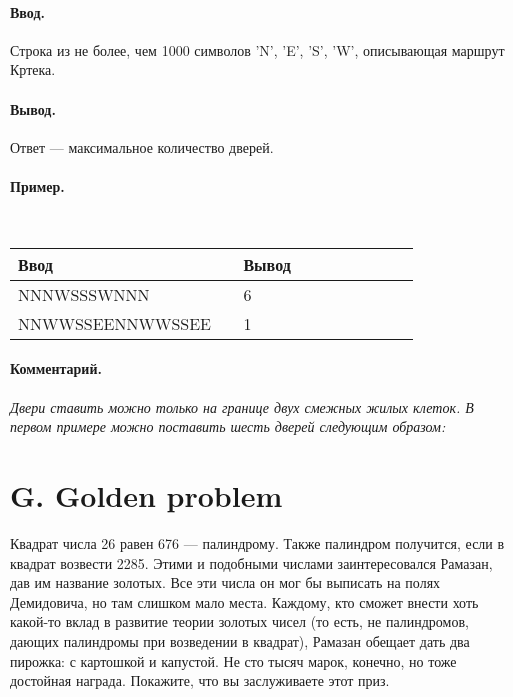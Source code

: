 \documentclass[10pt, a5paper]{article}
\newcommand{\informat}[1]
{
	\paragraph{Ввод.\\} #1
}
\newcommand{\outformat}[1]
{
	\paragraph{Вывод.\\} #1
}
\newcommand{\examplee}[4]
{
	\paragraph{Пример.\\}
	{\tt
	\begin{tabular}{|p{0.4\linewidth}|p{0.4\linewidth}|}
	\hline
	Ввод 	& Вывод  	\\
	\hline
	#1 		& #2 		\\
	\hline
	#3		& #4		\\
	\hline
	\end{tabular}
	}
}
\newcommand{\excomm}[1]
{
	\paragraph{Комментарий. \\}
	\textit{#1}
}
\begin{document}
\informat{Строка из не более, чем 1000 символов 'N', 'E', 'S', 'W', описывающая маршрут Кртека.}

\outformat{Ответ --- максимальное количество дверей.}

\examplee{NNNWSSSWNNN}{6}
{NNWWSSEENNWWSSEE}{1}

\excomm{Двери ставить можно только на границе двух смежных жилых клеток. В первом примере можно поставить шесть дверей следующим образом: }

\begin{center}
\end{center}




\section*{G. Golden problem}


Квадрат числа 26 равен 676 --- палиндрому. Также палиндром получится, если в квадрат возвести 2285. Этими и подобными числами заинтересовался Рамазан, дав им название золотых. Все эти числа он мог бы выписать на полях Демидовича, но там слишком мало места. Каждому, кто сможет внести хоть какой-то вклад в развитие теории золотых чисел (то есть, не палиндромов, дающих палиндромы при возведении в квадрат), Рамазан обещает дать два пирожка: с картошкой и капустой. Не сто тысяч марок, конечно, но тоже до\-стой\-ная награда. Покажите, что вы заслуживаете этот приз.
\end{document}
